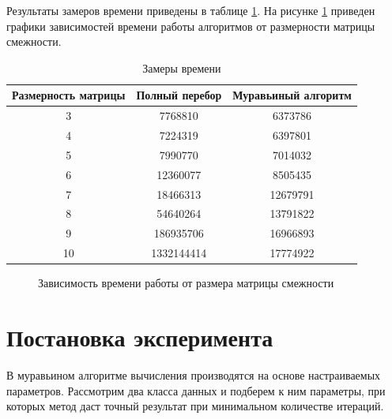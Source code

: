 \documentclass[12pt]{report}
\begin{document}
Результаты замеров времени приведены в таблице \ref{time1}. На рисунке \ref{timeRes1} приведен графики зависимостей времени работы алгоритмов от размерности матрицы смежности.


\begin{table}[h]
	\begin{center}
		\caption{\label{time1} Замеры времени}
		\begin{tabular}{|c | c | c|} 
 			\hline
			Размерность матрицы & Полный перебор & Муравьиный алгоритм\\ [0.5ex] 
 			\hline\hline
 			3 & 7768810 & 6373786\\
 			\hline
 			4 & 7224319 & 6397801\\
 			\hline
			5 & 7990770 & 7014032\\
			\hline
			6 & 12360077 & 8505435\\
			\hline
			7 & 18466313 & 12679791\\
			\hline
			8 & 54640264 & 13791822\\
			\hline
			9 & 186935706 & 16966893\\
			\hline
			10 & 1332144414 & 17774922\\
			\hline
			\end{tabular}
	\end{center}
\end{table}

\begin{figure}[h]
\begin{center}
	\captionsetup{justification=centering}
	\caption{Зависимость времени работы от размера матрицы смежности}
	\label{timeRes1}
	\end{center}
\end{figure}

\newpage

\section{Постановка эксперимента}
В муравьином алгоритме вычисления производятся на основе настраиваемых параметров.
Рассмотрим два класса данных и подберем к ним параметры, при которых метод даст точный результат при минимальном количестве итераций.
\end{document}
